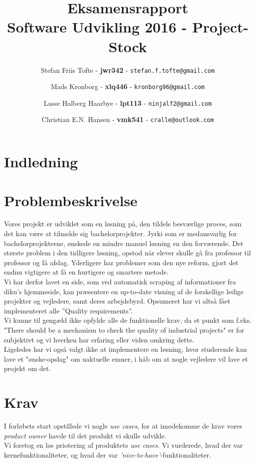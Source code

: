 \documentclass[12pt]{article}
\title{
  \vspace{3cm}
  \Huge{Eksamensrapport} \\
  \Large{Software Udvikling 2016 - Project-Stock}
}
\author{
	\Large{Stefan Friis Tofte} - \textbf{jwr342} - \texttt{stefan.f.tofte@gmail.com}
	\and
	\Large{Mads Kronborg} - \textbf{xlq446} - \texttt{kronborg96@gmail.com}
	\and
	\Large{Lasse Halberg Haarbye} - \textbf{lpt113} - \texttt{ninjalf2@gmail.com}
	\and
	\Large{Christian E.N. Hansen} - \textbf{vmk541} - \texttt{cralle@outlook.com}
}
\def \ColourPDF {../include/ku-farve}
\def \TitlePDF {../include/ku-en}  %
\begin{document}


\clearpage\maketitle
\thispagestyle{empty}

\newpage
\tableofcontents
\newpage

\section{Indledning}
\label{sec:indledning}

\section{Problembeskrivelse}
\label{sec:problem}
Vores projekt er udviklet som en løsning på, den tildels besværlige proces, som det kan være at tilmelde sig bachelorprojekter. Jyrki som er medansvarlig for bachelorprojekterne, ønskede en mindre manuel løsning en den forværende. Det største problem i den tidligere løsning, opstod når elever skulle gå fra professor til professor og få afslag. Yderligere har problemer som den nye reform, gjort det endnu vigtigere at få en hurtigere og smartere metode. \\
Vi har derfor lavet en side, som ved automatisk scraping af informationer fra diku's hjemmeside, kan præsentere en up-to-date visning af de forskellige ledige projekter og vejledere, samt deres arbejdsbyrd. Opsumeret har vi altså fået implementeret alle ''Quality requirements''. \\
Vi kunne til gengæld ikke opfylde alle de funktionelle krav, da et punkt som f.eks. "There should be a mechanism to check the quality of industrial projects" er for subjektivt og vi hverken har erfaring eller viden omkring dette. \\
Ligeledes har vi også valgt ikke at implementere en løsning, hvor studerende kan lave et "ønske-opslag" om uaktuelle emner, i håb om at nogle vejledere vil lave et projekt om det.


\section{Krav}
\label{sec:krav}
I forløbets start opstillede vi nogle \textit{use cases}, for at imødekomme de krav vores \textit{product owner} havde til det produkt vi skulle udvikle. \\
Vi foretog en løs priotering af produktets \textit{use cases}. Vi vurderede, hvad der var kernefunktionaliteter, og hvad der var \textit{'nice-to-have'}-funktionaliteter.
\end{document}
